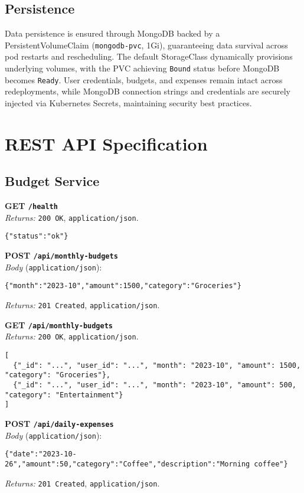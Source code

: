 \documentclass[conference]{IEEEtran}
\begin{document}
\subsection{Persistence}
Data persistence is ensured through MongoDB backed by a PersistentVolumeClaim (\texttt{mongodb-pvc}, 1Gi), guaranteeing data survival across pod restarts and rescheduling. The default StorageClass dynamically provisions underlying volumes, with the PVC achieving \texttt{Bound} status before MongoDB becomes \texttt{Ready}. User credentials, budgets, and expenses remain intact across redeployments, while MongoDB connection strings and credentials are securely injected via Kubernetes Secrets, maintaining security best practices.

\section{\textbf{REST API Specification}}

\subsection{Budget Service}
\noindent\textbf{GET \texttt{/health}} \\
\emph{Returns:} \texttt{200 OK}, \texttt{application/json}.
\begin{lstlisting}[style=json]
{"status":"ok"}
\end{lstlisting}

\noindent\textbf{POST \texttt{/api/monthly-budgets}} \\
\emph{Body} (\texttt{application/json}):
\begin{lstlisting}[style=json]
{"month":"2023-10","amount":1500,"category":"Groceries"}
\end{lstlisting}
\emph{Returns:} \texttt{201 Created}, \texttt{application/json}.

\noindent\textbf{GET \texttt{/api/monthly-budgets}} \\
\emph{Returns:} \texttt{200 OK}, \texttt{application/json}.
\begin{lstlisting}[style=json]
[
  {"_id": "...", "user_id": "...", "month": "2023-10", "amount": 1500, "category": "Groceries"},
  {"_id": "...", "user_id": "...", "month": "2023-10", "amount": 500, "category": "Entertainment"}
]
\end{lstlisting}

\noindent\textbf{POST \texttt{/api/daily-expenses}} \\
\emph{Body} (\texttt{application/json}):
\begin{lstlisting}[style=json]
{"date":"2023-10-26","amount":50,"category":"Coffee","description":"Morning coffee"}
\end{lstlisting}
\emph{Returns:} \texttt{201 Created}, \texttt{application/json}.
\end{document}
